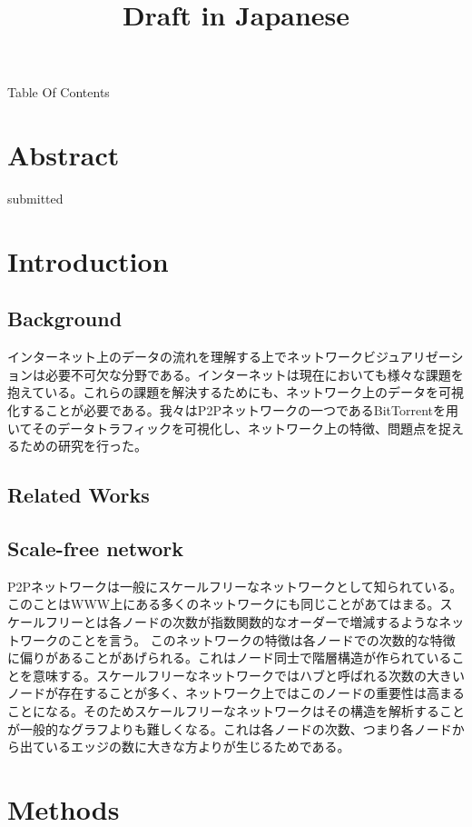 \documentclass{jsarticle}
\title{Draft in Japanese}
\begin{document}
\begin{center}{\Huge Table Of Contents}\end{center}
\section{Abstract}
submitted
\section{Introduction}
\subsection{Background}
インターネット上のデータの流れを理解する上でネットワークビジュアリゼーションは必要不可欠な分野である。インターネットは現在においても様々な課題を抱えている。これらの課題を解決するためにも、ネットワーク上のデータを可視化することが必要である。我々はP2Pネットワークの一つであるBitTorrentを用いてそのデータトラフィックを可視化し、ネットワーク上の特徴、問題点を捉えるための研究を行った。
\subsection{Related Works}
\subsection{Scale-free network}
P2Pネットワークは一般にスケールフリーなネットワークとして知られている。このことはWWW上にある多くのネットワークにも同じことがあてはまる。スケールフリーとは各ノードの次数が指数関数的なオーダーで増減するようなネットワークのことを言う。\cite{scale-free} このネットワークの特徴は各ノードでの次数的な特徴に偏りがあることがあげられる。これはノード同士で階層構造が作られていることを意味する。スケールフリーなネットワークではハブと呼ばれる次数の大きいノードが存在することが多く、ネットワーク上ではこのノードの重要性は高まることになる。そのためスケールフリーなネットワークはその構造を解析することが一般的なグラフよりも難しくなる。これは各ノードの次数、つまり各ノードから出ているエッジの数に大きな方よりが生じるためである。
\section{Methods}
\end{document}
